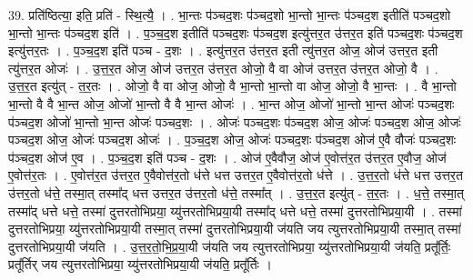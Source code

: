 \documentclass[17pt]{extarticle}
\begin{document}
39. प्रति॑ष्ठित्या॒ इति॒ प्रति॑ - स्थि॒त्यै॒ । . भा॒न्तः प॑ञ्चद॒शः प॑ञ्चद॒शो भा॒न्तो भा॒न्तः प॑ञ्चद॒श इतीति॑ पञ्चद॒शो भा॒न्तो भा॒न्तः प॑ञ्चद॒श इति॑ । . प॒ञ्च॒द॒श इतीति॑ पञ्चद॒शः प॑ञ्चद॒श इत्यु॑त्तर॒त उ॑त्तर॒त इति॑ पञ्चद॒शः प॑ञ्चद॒श इत्यु॑त्तर॒तः । . प॒ञ्च॒द॒श इति॑ पञ्च - द॒शः । . इत्यु॑त्तर॒त उ॑त्तर॒त इती त्यु॑त्तर॒त ओज॒ ओज॑ उत्तर॒त इती त्यु॑त्तर॒त ओजः॑ । . उ॒त्त॒र॒त ओज॒ ओज॑ उत्तर॒त उ॑त्तर॒त ओजो॒ वै वा ओज॑ उत्तर॒त उ॑त्तर॒त ओजो॒ वै । . उ॒त्त॒र॒त इत्यु॑त् - त॒र॒तः । . ओजो॒ वै वा ओज॒ ओजो॒ वै भा॒न्तो भा॒न्तो वा ओज॒ ओजो॒ वै भा॒न्तः । . वै भा॒न्तो भा॒न्तो वै वै भा॒न्त ओज॒ ओजो॑ भा॒न्तो वै वै भा॒न्त ओजः॑ । . भा॒न्त ओज॒ ओजो॑ भा॒न्तो भा॒न्त ओजः॑ पञ्चद॒शः प॑ञ्चद॒श ओजो॑ भा॒न्तो भा॒न्त ओजः॑ पञ्चद॒शः । . ओजः॑ पञ्चद॒शः प॑ञ्चद॒श ओज॒ ओजः॑ पञ्चद॒श ओज॒ ओजः॑ पञ्चद॒श ओज॒ ओजः॑ पञ्चद॒श ओजः॑ । . प॒ञ्च॒द॒श ओज॒ ओजः॑ पञ्चद॒शः प॑ञ्चद॒श ओज॑ ए॒वै वौजः॑ पञ्चद॒शः प॑ञ्चद॒श ओज॑ ए॒व । . प॒ञ्च॒द॒श इति॑ पञ्च - द॒शः । . ओज॑ ए॒वैवौज॒ ओज॑ ए॒वोत्त॑र॒त उ॑त्तर॒त ए॒वौज॒ ओज॑ ए॒वोत्त॑र॒तः । . ए॒वोत्त॑र॒त उ॑त्तर॒त ए॒वैवोत्त॑र॒तो ध॑त्ते धत्त उत्तर॒त ए॒वैवोत्त॑र॒तो ध॑त्ते । . उ॒त्त॒र॒तो ध॑त्ते धत्त उत्तर॒त उ॑त्तर॒तो ध॑त्ते॒ तस्मा॒त् तस्मा᳚द् धत्त उत्तर॒त उ॑त्तर॒तो ध॑त्ते॒ तस्मा᳚त् । . उ॒त्त॒र॒त इत्यु॑त् - त॒र॒तः । . ध॒त्ते॒ तस्मा॒त् तस्मा᳚द् धत्ते धत्ते॒ तस्मा॑ दुत्तरतोभिप्रया॒ य्यु॑त्तरतोभिप्रया॒यी तस्मा᳚द् धत्ते धत्ते॒ तस्मा॑ दुत्तरतोभिप्रया॒यी । . तस्मा॑ दुत्तरतोभिप्रया॒ य्यु॑त्तरतोभिप्रया॒यी तस्मा॒त् तस्मा॑ दुत्तरतोभिप्रया॒यी ज॑यति जय त्युत्तरतोभिप्रया॒यी तस्मा॒त् तस्मा॑ दुत्तरतोभिप्रया॒यी ज॑यति । . उ॒त्त॒र॒तो॒भि॒प्र॒या॒यी ज॑यति जय त्युत्तरतोभिप्रया॒ य्यु॑त्तरतोभिप्रया॒यी ज॑यति॒ प्रतू᳚र्तिः॒ प्रतू᳚र्तिर् जय 
त्युत्तरतोभिप्रया॒ य्यु॑त्तरतोभिप्रया॒यी ज॑यति॒ प्रतू᳚र्तिः । \newline
\end{document}
